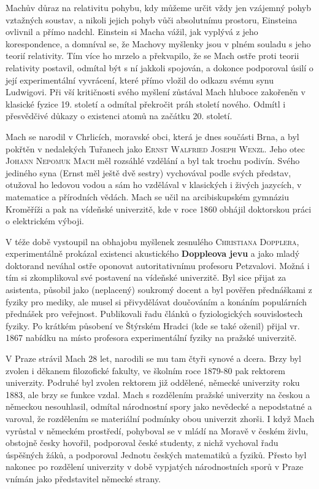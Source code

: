         Machův důraz na relativitu pohybu, kdy můžeme určit vždy jen vzájemný pohyb vztažných
        soustav, a nikoli jejich pohyb vůči absolutnímu prostoru, Einsteina ovlivnil a přímo nadchl.
        Einstein si Macha vážil, jak vyplývá z jeho korespondence, a domníval se, že Machovy
        myšlenky jsou v plném souladu s jeho teorií relativity. Tím více ho mrzelo a překvapilo, že
        se Mach ostře proti teorii relativity postavil, odmítal být s ní jakkoli spojován, a dokonce
        podporoval úsilí o její experimentální vyvrácení, které přímo vložil do odkazu svému synu
        Ludwigovi. Při vší kritičnosti svého myšlení zůstával Mach hluboce zakořeněn v klasické
        fyzice 19. století a odmítal překročit práh století nového. Odmítl i přesvědčivé důkazy o
        existenci atomů na začátku 20. století.

        Mach se narodil v Chrlicích, moravské obci, která je dnes součásti Brna, a byl pokřtěn v
        nedalekých Tuřanech jako \textsc{Ernst Walfried Joseph Wenzl}. Jeho otec \textsc{Johann
        Nepomuk Mach} měl rozsáhlé vzdělání a byl tak trochu podivín. Svého jediného syna (Ernst měl
        ještě dvě sestry) vychovával podle svých představ, otužoval ho ledovou vodou a sám ho
        vzdělával v klasických i živých jazycích, v matematice a přírodních vědách. Mach se učil na
        arcibiskupském gymnáziu Kroměříži a pak na vídeňské univerzitě, kde v roce 1860 obhájil
        doktorskou práci o elektrickém výboji.

        V téže době vystoupil na obhajobu myšlenek zesnulého \textsc{Christiana Dopplera},
        experimentálně prokázal existenci akustického \textbf{Doppleova jevu} a jako mladý doktorand
        neváhal ostře oponovat autoritativnímu profesoru Petzvalovi. Možná i tím si zkomplikoval své
        postavení na vídeňské univerzitě. Byl sice přijat za asistenta, působil jako (neplacený)
        soukromý docent a byl pověřen přednáškami z fyziky pro mediky, ale musel si přivydělávat
        doučováním a konáním populárních přednášek pro veřejnost. Publikovali řadu článků o
        fyziologických souvislostech fyziky. Po krátkém působení ve Štýrském Hradci (kde se také
        oženil) přijal vr. 1867 nabídku na místo profesora experimentální fyziky na pražské
        univerzitě.

        V Praze strávil Mach 28 let, narodili se mu tam čtyři synové a dcera. Brzy byl zvolen i
        děkanem filozofické fakulty, ve školním roce 1879-80 pak rektorem univerzity. Podruhé byl
        zvolen rektorem již oddělené, německé univerzity roku 1883, ale brzy se funkce vzdal. Mach s
        rozdělením pražské univerzity na českou a německou nesouhlasil, odmítal národnostní spory
        jako nevědecké a nepodstatné a varoval, že rozdělením se materiální podmínky obou univerzit
        zhorši. I když Mach vyrůstal v německém prostředí, pohyboval se v mládí na Moravě v českém
        živlu, obstojně česky hovořil, podporoval české studenty, z nichž vychoval řadu úspěšných
        žáků, a podporoval Jednotu českých matematiků a fyziků. Přesto byl nakonec po rozdělení
        univerzity v době vypjatých národnostních sporů v Praze vnímán jako představitel německé
        strany. 

